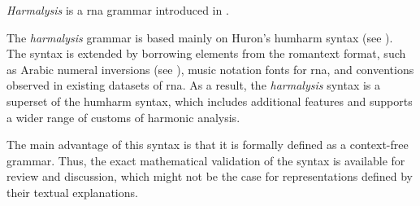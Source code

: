 

\emph{Harmalysis} is a \gls{rna} grammar introduced in
\textcite{napoleslopez2020harmalysis}.

The \emph{harmalysis} grammar is based mainly on Huron's
\gls{humharm} syntax (see ).
The syntax is extended by borrowing elements from the
\gls{romantext} format, such as Arabic numeral inversions
(see ), music notation fonts for
\gls{rna},
and conventions observed in existing datasets of \gls{rna}.
As  a result,  the \emph{harmalysis} syntax is a superset of
the \gls{humharm} syntax,  which includes additional
features and supports a wider range of customs of harmonic
analysis.

The main advantage of this syntax is that it is formally
defined as a context-free grammar. Thus, the exact
mathematical validation of the syntax is available for
review and discussion, which might not be the case for
representations defined by their textual explanations.
